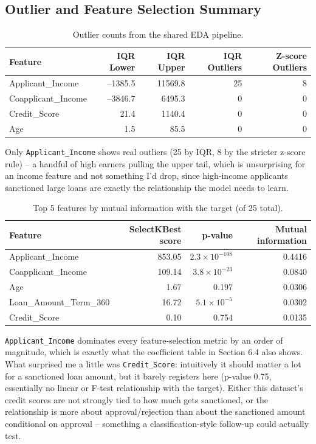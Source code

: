 \documentclass[11pt,a4paper]{article}
\begin{document}
\subsection{Outlier and Feature Selection Summary}
\begin{table}[h]
\centering
\begin{tabular}{@{}lrrrr@{}}
\toprule
Feature & IQR Lower & IQR Upper & IQR Outliers & Z-score Outliers \\
\midrule
Applicant\_Income & --1385.5 & 11569.8 & 25 & 8 \\
Coapplicant\_Income & --3846.7 & 6495.3 & 0 & 0 \\
Credit\_Score & 21.4 & 1140.4 & 0 & 0 \\
Age & 1.5 & 85.5 & 0 & 0 \\
\bottomrule
\end{tabular}
\caption{Outlier counts from the shared EDA pipeline.}
\end{table}
Only \texttt{Applicant\_Income} shows real outliers (25 by IQR, 8 by the stricter z-score rule) -- a handful of high earners pulling the upper tail, which is unsurprising for an income feature and not something I'd drop, since high-income applicants sanctioned large loans are exactly the relationship the model needs to learn.

\begin{table}[h]
\centering
\small
\begin{tabular}{@{}lrrr@{}}
\toprule
Feature & SelectKBest score & p-value & Mutual information \\
\midrule
Applicant\_Income & 853.05 & $2.3\times10^{-108}$ & 0.4416 \\
Coapplicant\_Income & 109.14 & $3.8\times10^{-23}$ & 0.0840 \\
Age & 1.67 & 0.197 & 0.0306 \\
Loan\_Amount\_Term\_360 & 16.72 & $5.1\times10^{-5}$ & 0.0302 \\
Credit\_Score & 0.10 & 0.754 & 0.0135 \\
\bottomrule
\end{tabular}
\caption{Top 5 features by mutual information with the target (of 25 total).}
\end{table}
\texttt{Applicant\_Income} dominates every feature-selection metric by an order of magnitude, which is exactly what the coefficient table in Section 6.4 also shows. What surprised me a little was \texttt{Credit\_Score}: intuitively it should matter a lot for a sanctioned loan amount, but it barely registers here (p-value 0.75, essentially no linear or F-test relationship with the target). Either this dataset's credit scores are not strongly tied to how much gets sanctioned, or the relationship is more about approval/rejection than about the sanctioned amount conditional on approval -- something a classification-style follow-up could actually test.
\end{document}
